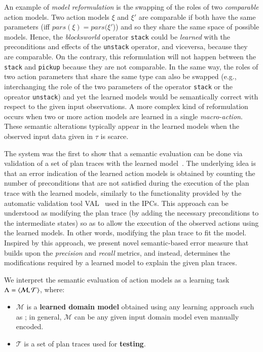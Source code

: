 An example of \emph{model reformulation} is the swapping of the roles of two {\em comparable} action models. Two action models $\xi$ and $\xi'$ are comparable if both have the same parameters (iff $pars(\xi)=pars(\xi'$)) and so they share the same space of possible models. Hence, the {\em blocksworld} operator {\small\tt stack} could be {\em learned} with the preconditions and effects of the {\small\tt unstack} operator, and viceversa, because they are comparable. On the contrary, this reformulation will not happen between the {\tt stack} and {\tt pickup} because they are not comparable. In the same way, the roles of two action parameters that share the same type can also be swapped (e.g., interchanging the role of the two parameters of the operator {\small\tt stack} or the opreator {\small\tt unstack}) and yet the learned models would be semantically correct with respect to the given input observations. A more complex kind of reformulation occurs when two or more action models are learned in a single \emph{macro-action}. These semantic alterations typically appear in the learned models when the observed input data given in $\tau$ is scarce.


The \ARMS system was the first to show that a semantic evaluation can be done via validation of a set of plan traces with the learned model~\cite{yang2007learning}. The underlying idea is that an error indication of the learned action models is obtained by counting the number of preconditions that are not satisfied during the execution of the plan trace with the learned models, similarly to the functionality provided by the automatic validation tool VAL~\cite{howey2004val} used in the IPCs. This approach can be understood as modifying the plan trace (by adding the necessary preconditions to the intermediate states) so as to allow the execution of the observed actions using the learned models. In other words, modifying the plan trace to fit the model. Inspired by this approach, we present novel semantic-based error measure that builds upon the {\em precision} and {\em recall} metrics, and instead, determines the modifications required by a learned model to explain the given plan traces.


We interpret the semantic evaluation of action models as a learning task $\Lambda = {\langle \mathcal{M}, \mathcal{T} \rangle}$, where:

\begin{itemize}
	\item $\mathcal{M}$ is a \textbf{learned domain model} obtained using any learning approach such as \FAMA; in general, $\mathcal{M}$ can be any given input domain model even manually encoded.
	\item$\mathcal{T}$ is a set of plan traces  used for \textbf{testing}.
\end{itemize}


